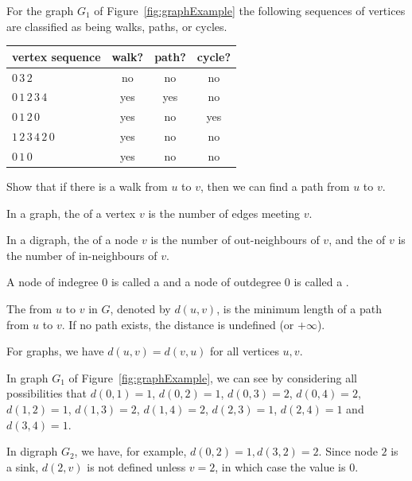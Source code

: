 \begin{Example}
For the graph $G_1$ of Figure~\ref{fig:graphExample} the following
sequences of vertices are classified as being walks, paths, or cycles.

\medskip

\begin{center}
\begin{tabular}{|l|c|c|c|}\hline
\textbf{vertex sequence} & \textbf{walk?} & \textbf{path?} & \textbf{cycle?} \\ \hline
$0\, 3\, 2$ & no & no & no  \\
$0\, 1\, 2\, 3\, 4$ & yes & yes & no  \\
$0\, 1\,  2\,  0$ & yes & no & yes  \\
$1\,  2\,  3\,  4\,  2\,  0$ & yes & no & no \\
$0 \, 1\,  0$ & yes & no & no \\
\hline
\end{tabular}
\end{center}
\end{Example}



\beginboxedexample
Show that if there is a walk from $u$ to $v$, then we can find a path from $u$ to $v$.
\endboxedexample{8cm}



\begin{Definition} 
In a graph, the  of a vertex $v$ is the number of edges
meeting $v$. 

In a digraph, the  of a node $v$ is the
number of out-neighbours of $v$, and the  of $v$ is the
number of in-neighbours of $v$.

A node of indegree $0$ is called a  and a node of outdegree $0$ is called a .
\end{Definition}


\begin{Definition}
The  from $u$ to $v$ in $G$, denoted by $d(u,v)$, is 
the minimum length of a path from $u$ to $v$. If no path exists, the 
distance is undefined (or $+\infty$).
\end{Definition}

For graphs, we have $d(u,v) = d(v,u)$ for all vertices $u, v$. 


\begin{Example}
In graph $G_1$ of Figure~\ref{fig:graphExample}, we can see by considering
all possibilities that $d(0, 1) = 1$, $d(0, 2) = 1$, $d(0, 3) = 2$,
$d(0, 4) = 2$, $d(1, 2) = 1$, $d(1, 3) = 2$, $d(1, 4) = 2$, $d(2, 3) =
1$, $d(2, 4) = 1$ and $d(3, 4) = 1$.

In digraph $G_2$, we have, for example, $d(0, 2) = 1, 
d(3, 2) = 2$. Since node $2$ is a sink, $d(2, v)$ is not defined 
unless $v = 2$, in which case the value is $0$.

\end{Example}

